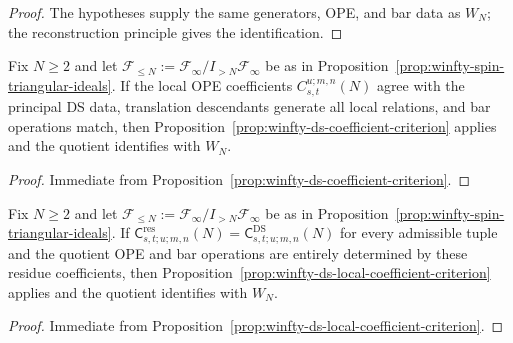\begin{proof}
The hypotheses supply the same generators, OPE, and bar data as $W_N$; the reconstruction principle gives the identification.
\end{proof}

\begin{proposition}
\label{prop:winfty-ds-local-coefficient-criterion}
Fix $N \ge 2$ and let
$\mathcal{F}_{\le N}:=\mathcal{F}_\infty/I_{>N}\mathcal{F}_\infty$
be as in
Proposition~\ref{prop:winfty-spin-triangular-ideals}. If the local
OPE coefficients $C_{s,t}^{u;m,n}(N)$ agree with the principal DS data,
translation descendants generate all local relations, and bar operations
match, then Proposition~\ref{prop:winfty-ds-coefficient-criterion}
applies and the quotient identifies with $W_N$.
\end{proposition}

\begin{proof}
Immediate from Proposition~\ref{prop:winfty-ds-coefficient-criterion}.
\end{proof}

\begin{proposition}
\label{prop:winfty-ds-residue-identity-criterion}
Fix $N \ge 2$ and let
$\mathcal{F}_{\le N}:=\mathcal{F}_\infty/I_{>N}\mathcal{F}_\infty$
be as in Proposition~\ref{prop:winfty-spin-triangular-ideals}.
If $\mathsf{C}^{\mathrm{res}}_{s,t;u;m,n}(N)
= \mathsf{C}^{\mathrm{DS}}_{s,t;u;m,n}(N)$
for every admissible tuple and the quotient OPE and bar operations are
entirely determined by these residue coefficients, then
Proposition~\ref{prop:winfty-ds-local-coefficient-criterion} applies
and the quotient identifies with $W_N$.
\end{proposition}

\begin{proof}
Immediate from Proposition~\ref{prop:winfty-ds-local-coefficient-criterion}.
\end{proof}

